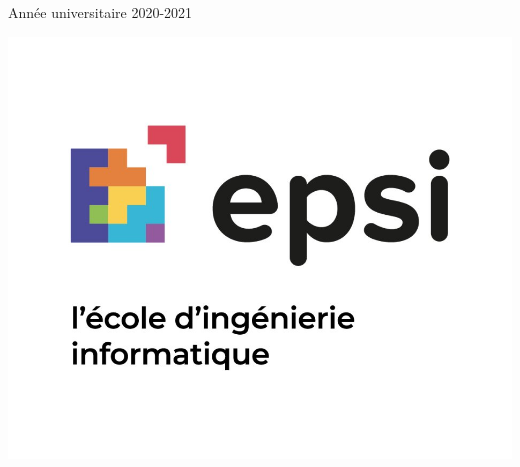 \begin{titlepage}


{\large Année universitaire 2020-2021} %


\includegraphics[scale=0.16]{images/epsi_logo.jpg}\\[1cm] %
 

\vfill %

\end{titlepage}




\newpage
\tableofcontents
\newpage





